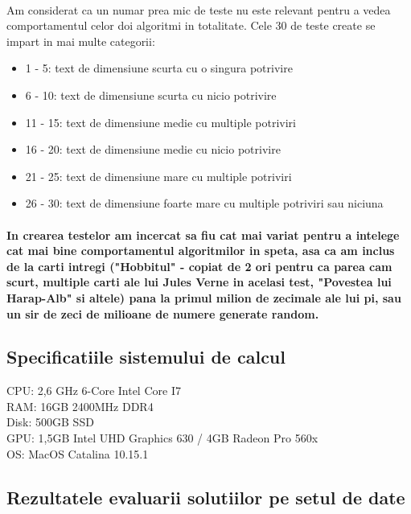 \documentclass[runningheads]{llncs}
\begin{document}
\paragraph{} Am considerat ca un numar prea mic de teste nu este relevant pentru a vedea comportamentul celor doi algoritmi in totalitate. Cele 30 de teste create se impart in mai multe categorii: \\
\begin{itemize}
\item 1 - 5: text de dimensiune scurta cu o singura potrivire 
\item 6 - 10: text de dimensiune scurta cu nicio potrivire 
\item 11 - 15: text de dimensiune medie cu multiple potriviri 
\item 16 - 20: text de dimensiune medie cu nicio potrivire 
\item 21 - 25: text de dimensiune mare cu multiple potriviri 
\item 26 - 30: text de dimensiune foarte mare cu multiple potriviri sau niciuna 
\end{itemize}
\paragraph{In crearea testelor am incercat sa fiu cat mai variat pentru a intelege cat mai bine comportamentul algoritmilor in speta, asa ca am inclus de la carti intregi ("Hobbitul" - copiat de 2 ori pentru ca parea cam scurt, multiple carti ale lui Jules Verne in acelasi test, "Povestea lui Harap-Alb" si altele) pana la primul milion de zecimale ale lui pi, sau un sir de zeci de milioane de numere generate random.}

	
\subsection{Specificatiile sistemului de calcul}
CPU: 2,6 GHz 6-Core Intel Core I7 \\
RAM: 16GB 2400MHz DDR4 \\
Disk: 500GB SSD \\
GPU: 1,5GB Intel UHD Graphics 630 / 4GB Radeon Pro 560x \\
OS: MacOS Catalina 10.15.1 \\

\subsection{Rezultatele evaluarii solutiilor pe setul de date}
\end{document}
